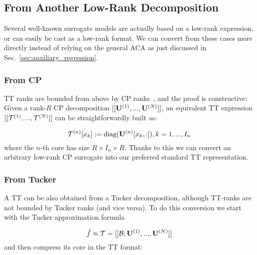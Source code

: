 \documentclass[review, twocolumn]{svjour3}          %
\begin{document}
\subsection{From Another Low-Rank Decomposition} \label{sec:from_low_rank}

Several well-known surrogate models are actually based on a low-rank expression, or can easily be cast as a low-rank format. We can convert from these cases more directly instead of relying on the general ACA as just discussed in Sec.~\ref{sec:auxiliary_regression}.


\subsubsection{From CP} \label{sec:from_cp}


TT ranks are bounded from above by CP ranks~\cite{Oseledets:11}, and the proof is constructive: Given a rank-$R$ CP decomposition $[[\mathbf{U}^{(1)}, ..., \mathbf{U}^{(N)}]]$, an equivalent TT expression $[[\mathcal{T}^{(1)}, ..., \mathcal{T}^{(N)}]]$ can be straightforwardly built as:

\begin{equation}
\mathcal{T}^{(n)}[x_k] := \mbox{diag}(\mathbf{U}^{(n)}[x_k, :]), k = 1, ..., I_n
\end{equation}
%
where the $n$-th core has size $R \times I_n \times R$. Thanks to this we can convert an arbitrary low-rank CP surrogate into our preferred standard TT representation.

\subsubsection{From Tucker} \label{sec:from_tucker}

A TT can be also obtained from a Tucker decomposition, although TT-ranks are not bounded by Tucker ranks (and vice versa). To do this conversion we start with the Tucker approximation formula

\begin{equation}
\tilde{f} \approx \mathcal{T} = [[\mathcal{B}; \mathbf{U}^{(1)}, ..., \mathbf{U}^{(N)}]]
\end{equation}
%
and then compress its core in the TT format:
\end{document}
